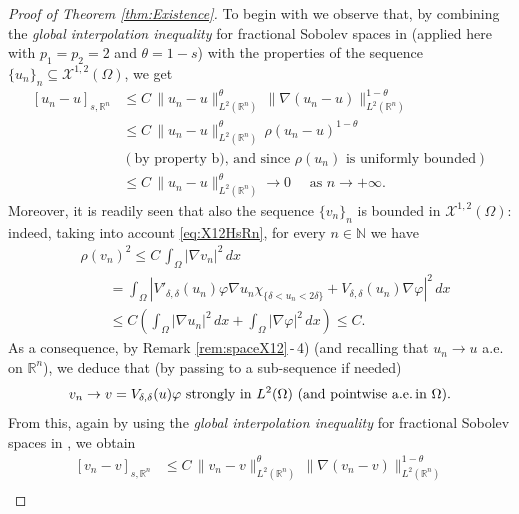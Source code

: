 \documentclass[11pt,a4paper]{amsart}
\def \R {\mathbb{R}}
\theoremstyle{definition}
\theoremstyle{plain}
\numberwithin{equation}{section}
\begin{document}
{\begin{proof}[Proof of Theorem \ref{thm:Existence}]
To begin with we observe that, by combining the \emph{global interpolation
inequality} for fractional Sobolev spaces in 
\cite[Theorem 7.45]{LeoniFract}
(applied here with $p_1=p_2=2$ and $\theta = 1-s$) with
the properties of the sequence 
$\{u_n\}_n\subseteq\mathcal{X}^{1,2}(\Omega)$, we get
\begin{equation} \label{eq:convergenceunStrongHs}
\begin{split}
	[u_n-u]_{s,\mathbb{R}^{n}} &\leq C \, \|u_n-u\|_{L^{2}(\mathbb{R}^{n})}^{\theta}\, 
	\|\nabla(u_n-u)\|^{1-\theta}_{L^{2}(\mathbb{R}^{n})} \\
	& \leq C\,\|u_n-u\|_{L^{2}(\mathbb{R}^{n})}^{\theta}\,\rho(u_n-u)^{1-\theta}\\
	& (\text{by property b), and since $\rho(u_n)$ is uniformly bounded}) \\
	& \leq C\,\|u_n-u\|_{L^{2}(\mathbb{R}^{n})}^{\theta}
	\to 0 \quad \textrm{ as } n \to +\infty.
	\end{split}
\end{equation}
Moreover, it is readily seen that also the sequence $\{v_n\}_n$ is bounded in $\mathcal{X}^{1,2}(\Omega)$:
indeed, taking into account \eqref{eq:X12HsRn}, for every $n\in\mathbb{N}$ we have
\begin{equation}
 	\begin{aligned}
 		& \rho(v_n)^2\leq C\,\int_{\Omega}|\nabla v_n|^2\,dx 
 		 \\
 		 &\qquad= \int_{\Omega}\left|V'_{\delta,\delta}(u_n)\varphi \nabla u_{n} \chi_{\{\delta<u_n<2\delta\}} + V_{\delta,\delta}(u_n)\nabla \varphi\right|^2\,dx \\
 		&\qquad \leq C \left( \int_{\Omega}|\nabla u_n|^2\,dx +  \int_{\Omega}|\nabla \varphi|^2\,dx\right)
 		\leq C.
 	\end{aligned}
\end{equation}
As a consequence, by Remark \ref{rem:spaceX12}\,-\,4) (and recalling that
$u_n\to u$ a.e.\,on $\R^n$), we deduce that (by passing to a sub-sequence if needed)
$$\text{$v_n\to v = V_{\delta,\delta}(u)\varphi$ 
strongly in $L^{2}(\Omega)$ (and pointwise a.e.\,in $\Omega$)}. $$
From this,
again by using the \emph{global interpolation
inequality} for fractional Sobolev spa\-ces in 
\cite[Theorem 7.45]{LeoniFract}, we obtain
\begin{equation} \label{eq:convergencevnStrongHs}
\begin{split}
	[v_n-v]_{s,\mathbb{R}^{n}} &\leq C \, \|v_n-v\|_{L^{2}(\mathbb{R}^{n})}^{\theta}\, 
	\|\nabla(v_n-v)\|^{1-\theta}_{L^{2}(\mathbb{R}^{n})} \\

\end{split}
\end{equation}
\end{proof}}
\end{document}
